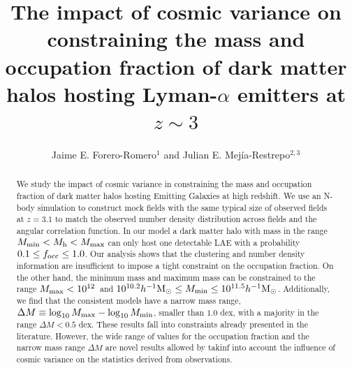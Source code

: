 \documentclass{emulateapj}
\newcommand{\ly}{{\ifmmode{{\rm Ly}\alpha}\else{Ly$\alpha$~}\fi}}
\newcommand{\hMsun}{{\ifmmode{h^{-1}{\rm
        {M_{\odot}}}}\else{$h^{-1}{\rm{M_{\odot}}}$}\fi}}
\begin{document}
\title{The impact of cosmic variance on constraining the mass and
  occupation fraction of dark matter halos hosting Lyman-$\alpha$
  emitters at $z \sim 3$}      
\author{
  Jaime E. Forero-Romero$^{1}$ and
  Julian E. Mej\'ia-Restrepo$^{2,3}$ 
}




\begin{abstract}
%
  We study the impact of cosmic variance in constraining the mass and
  occupation fraction of dark matter halos hosting \ly Emitting
  Galaxies at high redshift. We use an N-body simulation to construct
  mock fields with the same typical size of observed fields at
  $z=3.1$ to match the observed number density distribution across
  fields and the angular correlation function. In our model a dark
  matter halo with mass in the range $M_{\rm min}<M_{\rm h}<M_{\rm
    max}$ can only host one detectable LAE with a probability $0.1
  \leq f_{\rm occ}\leq 1.0$.  Our analysis shows that the clustering
  and number density information are insufficient to impose a tight
  constraint on the occupation fraction. On the other hand, the
  minimum mass and maximum mass can be constrained to the range
  $M_{\rm  max}<10^{12}$\hMsun\ and $10^{10.2}\hMsun\leq M_{\rm
    min}\leq 10^{11.5}\hMsun$. Additionally, we find that the
  consistent models have a narrow mass range, $\Delta M \equiv \log_{10}M_{\rm max} -
  \log_{10} M_{\rm min}$, smaller than $1.0$ dex, with a majority in
  the range $\Delta M<0.5$ dex. These results fall into constraints
  already presented in the literature. However, the wide range of
  values for the occupation fraction and the narrow mass range $\Delta
  M$ are novel results allowed by takinf into account the influence of
  cosmic variance on the statistics derived from observations.  
\end{abstract}


\end{document}
